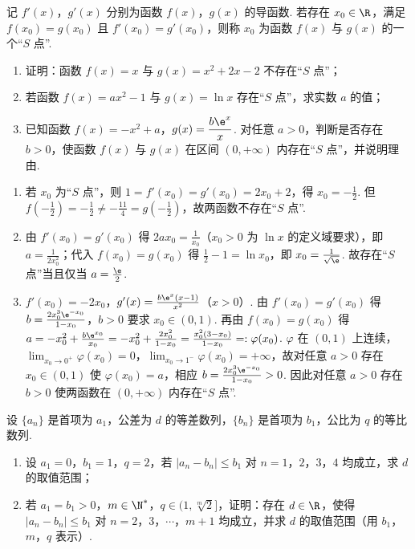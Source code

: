 \begin{problem}
记 \(f'(x)\)，\(g'(x)\) 分别为函数 \(f(x)\)，\(g(x)\) 的导函数. 若存在 \(x_0\in\R\)，满足 \(f(x_0)=g(x_0)\) 且 \(f'(x_0)=g'(x_0)\)，则称 \(x_0\) 为函数 \(f(x)\) 与 \(g(x)\) 的一个“\(S\) 点”.

\begin{enumerate}
\item 证明：函数 \(f(x)=x\) 与 \(g(x)=x^2+2x-2\) 不存在“\(S\) 点”；
\item 若函数 \(f(x)=ax^2-1\) 与 \(g(x)=\ln x\) 存在“\(S\) 点”，求实数 \(a\) 的值；
\item 已知函数 \(f(x)=-x^2+a\)，\(g(x)=\dfrac{b\e^x}{x}\). 对任意 \(a>0\)，判断是否存在 \(b>0\)，使函数 \(f(x)\) 与 \(g(x)\) 在区间 \((0,+\infty)\) 内存在“\(S\) 点”，并说明理由.
\end{enumerate}
\end{problem}

\begin{solution}
\begin{enumerate}
\item 若 \(x_0\) 为“\(S\) 点”，则 \(1=f'(x_0)=g'(x_0)=2x_0+2\)，得 \(x_0=-\frac12\). 但 \(f\left(-\frac12\right)=-\frac12\neq-\frac{11}{4}=g\left(-\frac12\right)\)，故两函数不存在“\(S\) 点”.
\item 由 \(f'(x_0)=g'(x_0)\) 得 \(2ax_0=\frac1{x_0}\)（\(x_0>0\) 为 \(\ln x\) 的定义域要求），即 \(a=\frac1{2x_0^2}\)；代入 \(f(x_0)=g(x_0)\) 得 \(\frac12-1=\ln x_0\)，即 \(x_0=\frac1{\sqrt\e}\). 故存在“\(S\) 点”当且仅当 \(a=\frac\e2\).
\item \(f'(x_0)=-2x_0\)，\(g'(x)=\frac{b\e^x(x-1)}{x^2}\)（\(x>0\)）. 由 \(f'(x_0)=g'(x_0)\) 得 \(b=\frac{2x_0^3\e^{-x_0}}{1-x_0}\)，\(b>0\) 要求 \(x_0\in(0,1)\). 再由 \(f(x_0)=g(x_0)\) 得 \(a=-x_0^2+\frac{b\e^{x_0}}{x_0}=-x_0^2+\frac{2x_0^2}{1-x_0}=\frac{x_0^2(3-x_0)}{1-x_0}=:\varphi(x_0)\). \(\varphi\) 在 \((0,1)\) 上连续，\(\lim_{x_0\to0^+}\varphi(x_0)=0\)，\(\lim_{x_0\to1^-}\varphi(x_0)=+\infty\)，故对任意 \(a>0\) 存在 \(x_0\in(0,1)\) 使 \(\varphi(x_0)=a\)，相应 \(b=\frac{2x_0^3\e^{-x_0}}{1-x_0}>0\). 因此对任意 \(a>0\) 存在 \(b>0\) 使两函数在 \((0,+\infty)\) 内存在“\(S\) 点”.
\end{enumerate}
\end{solution}

\begin{problem}
设 \(\{a_n\}\) 是首项为 \(a_1\)，公差为 \(d\) 的等差数列，\(\{b_n\}\) 是首项为 \(b_1\)，公比为 \(q\) 的等比数列.

\begin{enumerate}
\item 设 \(a_1=0\)，\(b_1=1\)，\(q=2\)，若 \(|a_n-b_n|\le b_1\) 对 \(n=1\)，\(2\)，\(3\)，\(4\) 均成立，求 \(d\) 的取值范围；
\item 若 \(a_1=b_1>0\)，\(m\in\N^*\)，\(q\in(1,\sqrt[m]{2}]\)，证明：存在 \(d\in\R\)，使得 \(|a_n-b_n|\le b_1\) 对 \(n=2\)，\(3\)，\(\cdots\)，\(m+1\) 均成立，并求 \(d\) 的取值范围（用 \(b_1\)，\(m\)，\(q\) 表示）.
\end{enumerate}
\end{problem}

